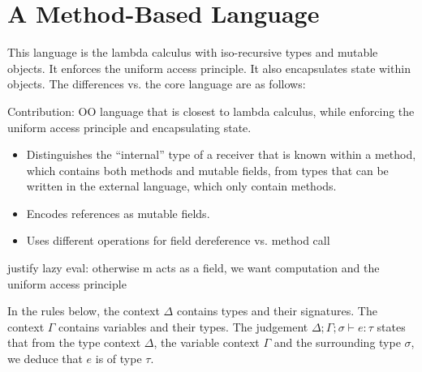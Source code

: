 \section{A Method-Based Language}

This language is the lambda calculus with iso-recursive types and mutable objects.  It enforces the uniform access principle.  It also encapsulates state within objects.  The differences vs. the core language are as follows:

Contribution: OO language that is closest to lambda calculus, while enforcing the uniform access principle and encapsulating state.

\begin{itemize}

 \item Distinguishes the ``internal'' type of a receiver that is known within a method, which contains both methods and mutable fields, from types that can be written in the external language, which only contain methods.
 
 \item Encodes references as mutable fields.
 
 \item Uses different operations for field dereference vs. method call

\end{itemize}

justify lazy eval: otherwise m acts as a field, we want computation and the uniform access principle

In the rules below, the context $\Delta$ contains types and their signatures. The context $\Gamma$ contains variables and their types. 
The judgement $\Delta; \Gamma; \sigma \vdash e:\tau $ states that from the type context $\Delta$, the variable context $\Gamma$ and the surrounding type $\sigma$, we deduce that $e$ is of type $\tau$.



